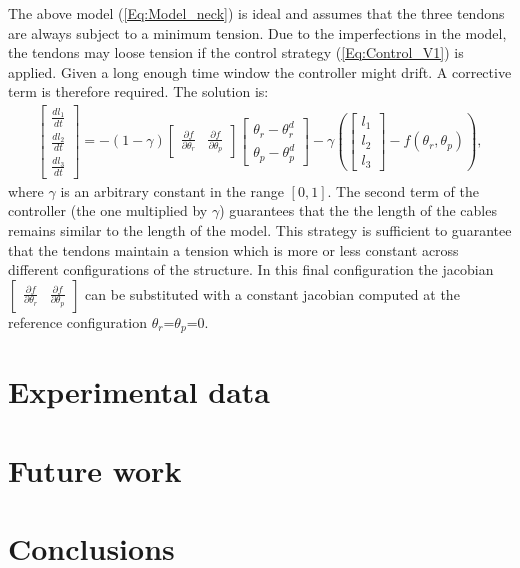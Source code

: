 \documentclass[9pt]{amsart}
\theoremstyle{definition}
\theoremstyle{remark}
\numberwithin{equation}{section}
\begin{document}
The above model (\ref{Eq:Model_neck}) is ideal and assumes that the three tendons are always subject to a minimum tension. Due to the imperfections in the model, the tendons may loose tension if the control strategy (\ref{Eq:Control_V1}) is applied. Given a long enough time window the controller might drift. A corrective term is therefore required. The solution is:
\begin{eqnarray} \label{Eq:Control_V2}
\begin{bmatrix}
\frac{d l_1}{dt}\\
\frac{d l_2}{dt}\\
\frac{d l_3}{dt}
\end{bmatrix} = -(1-\gamma)\begin{bmatrix} \frac{\partial f} {\partial \theta_r} &  \frac{\partial f} {\partial \theta_p} \end{bmatrix}
 \begin{bmatrix}
\theta_r - \theta_r^d\\
\theta_p - \theta_p^d
\end{bmatrix} - \gamma \left( \begin{bmatrix} l_1\\
l_2\\
l_3
\end{bmatrix} - f(\theta_r, \theta_p) \right),
\end{eqnarray}
where $\gamma$ is an arbitrary constant in the range $[0, 1]$. The second term of the controller (the one multiplied by $\gamma$) guarantees that the the length of the cables remains similar to the length of the model. This strategy is sufficient to guarantee that the tendons maintain a tension which is more or less constant across different configurations of the structure. In this final configuration the jacobian $\begin{bmatrix} \frac{\partial f} {\partial \theta_r} &  \frac{\partial f} {\partial \theta_p} \end{bmatrix}$ can be substituted with a constant jacobian computed at the reference configuration $\theta_r$=$\theta_p$=0.


\section{Experimental data} \label{Sec:ExpData}


\section{Future work} \label{Sec:FutureWork}



\section{Conclusions} \label{Sec:Conclusions}







\end{document}
